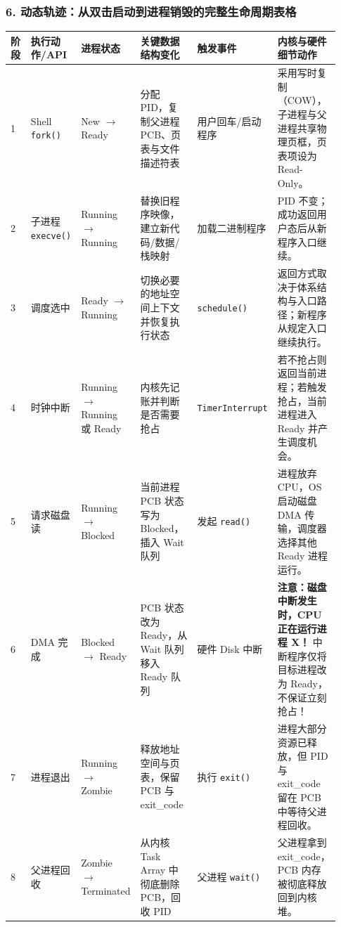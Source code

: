 \documentclass[11pt,a4paper,openany]{ctexbook}
\begin{document}
\subsubsection*{6. 动态轨迹：从双击启动到进程销毁的完整生命周期表格}
\begingroup
\small
\setlength{\tabcolsep}{2.5pt}
\begin{longtable}{p{0.07\linewidth}p{0.14\linewidth}p{0.14\linewidth}p{0.22\linewidth}p{0.17\linewidth}p{0.19\linewidth}}
\toprule
\textbf{阶段} & \textbf{执行动作/API} & \textbf{进程状态} & \textbf{关键数据结构变化} & \textbf{触发事件} & \textbf{内核与硬件细节动作} \\
\midrule
1 & Shell \texttt{fork()} & New $\rightarrow$ Ready & 分配 PID，复制父进程 PCB、页表与文件描述符表 & 用户回车/启动程序 & 采用写时复制（COW），子进程与父进程共享物理页框，页表项设为 Read-Only。 \\
\midrule
2 & 子进程 \texttt{execve()} & Running $\rightarrow$ Running & 替换旧程序映像，建立新代码/数据/栈映射 & 加载二进制程序 & PID 不变；成功返回用户态后从新程序入口继续。 \\
\midrule
3 & 调度选中 & Ready $\rightarrow$ Running & 切换必要的地址空间上下文并恢复执行状态 & \texttt{schedule()} & 返回方式取决于体系结构与入口路径；新程序从规定入口继续执行。 \\
\midrule
4 & 时钟中断 & Running $\rightarrow$ Running 或 Ready & 内核先记账并判断是否需要抢占 & \texttt{TimerInterrupt} & 若不抢占则返回当前进程；若触发抢占，当前进程进入 Ready 并产生调度机会。 \\
\midrule
5 & 请求磁盘读 & Running $\rightarrow$ Blocked & 当前进程 PCB 状态写为 Blocked，插入 Wait 队列 & 发起 \texttt{read()} & 进程放弃 CPU，OS 启动磁盘 DMA 传输，调度器选择其他 Ready 进程运行。 \\
\midrule
6 & DMA 完成 & Blocked $\rightarrow$ Ready & PCB 状态改为 Ready，从 Wait 队列移入 Ready 队列 & 硬件 Disk 中断 & \textbf{注意：磁盘中断发生时，CPU 正在运行进程 X！} 中断程序仅将目标进程改为 Ready，不保证立刻抢占！ \\
\midrule
7 & 进程退出 & Running $\rightarrow$ Zombie & 释放地址空间与页表，保留 PCB 与 exit\_code & 执行 \texttt{exit()} & 进程大部分资源已释放，但 PID 与 exit\_code 留在 PCB 中等待父进程回收。 \\
\midrule
8 & 父进程回收 & Zombie $\rightarrow$ Terminated & 从内核 Task Array 中彻底删除 PCB，回收 PID & 父进程 \texttt{wait()} & 父进程拿到 exit\_code，PCB 内存被彻底释放回到内核堆。 \\
\bottomrule
\end{longtable}
\endgroup
\end{document}
